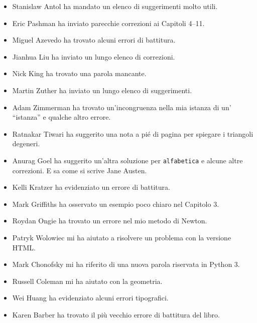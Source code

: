 \documentclass[10pt]{book}
\begin{document}
\begin{itemize}
\item Stanislaw Antol ha mandato un elenco di suggerimenti molto utili.

\item Eric Pashman ha inviato parecchie correzioni ai Capitoli 4--11.

\item Miguel Azevedo ha trovato alcuni errori di battitura.

\item Jianhua Liu ha inviato un lungo elenco di correzioni.

\item Nick King ha trovato una parola mancante.

\item Martin Zuther ha inviato un lungo elenco di suggerimenti.

\item Adam Zimmerman ha trovato un'incongruenza nella mia istanza di un' ``istanza'' e qualche altro errore.

\item Ratnakar Tiwari ha suggerito una nota a pié di pagina per spiegare i triangoli degeneri.

\item Anurag Goel ha suggerito un'altra soluzione per \verb"alfabetica"
e alcune altre correzioni. E sa come si scrive Jane Austen.

\item Kelli Kratzer ha evidenziato un errore di battitura.

\item Mark Griffiths ha osservato un esempio poco chiaro nel Capitolo 3.

\item Roydan Ongie ha trovato un errore nel mio metodo di Newton.

\item Patryk Wolowiec mi ha aiutato a risolvere un problema con la versione HTML.

\item Mark Chonofsky mi ha riferito di una nuova parola riservata in Python 3.

\item Russell Coleman mi ha aiutato con la geometria.

\item Wei Huang ha evidenziato alcuni errori tipografici.

\item Karen Barber ha trovato il più vecchio errore di battitura del libro.


\end{itemize}
\end{document}
